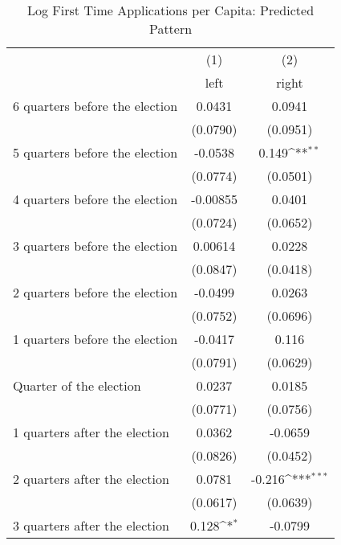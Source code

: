 \begin{table}[htbp]\centering
\def\sym#1{\ifmmode^{#1}\else\(^{#1}\)\fi}
\caption{Log First Time Applications per Capita: Predicted Pattern}
\begin{tabular}{l*{2}{c}}
\hline\hline
                    &\multicolumn{1}{c}{(1)}&\multicolumn{1}{c}{(2)}\\
                    &\multicolumn{1}{c}{left}&\multicolumn{1}{c}{right}\\
\hline
 6 quarters before the election&      0.0431         &      0.0941         \\
                    &    (0.0790)         &    (0.0951)         \\
[1em]
 5 quarters before the election&     -0.0538         &       0.149\sym{**} \\
                    &    (0.0774)         &    (0.0501)         \\
[1em]
 4 quarters before the election&    -0.00855         &      0.0401         \\
                    &    (0.0724)         &    (0.0652)         \\
[1em]
 3 quarters before the election&     0.00614         &      0.0228         \\
                    &    (0.0847)         &    (0.0418)         \\
[1em]
 2 quarters before the election&     -0.0499         &      0.0263         \\
                    &    (0.0752)         &    (0.0696)         \\
[1em]
 1 quarters before the election&     -0.0417         &       0.116         \\
                    &    (0.0791)         &    (0.0629)         \\
[1em]
Quarter of the election&      0.0237         &      0.0185         \\
                    &    (0.0771)         &    (0.0756)         \\
[1em]
 1 quarters after the election&      0.0362         &     -0.0659         \\
                    &    (0.0826)         &    (0.0452)         \\
[1em]
 2 quarters after the election&      0.0781         &      -0.216\sym{***}\\
                    &    (0.0617)         &    (0.0639)         \\
[1em]
 3 quarters after the election&       0.128\sym{*}  &     -0.0799         \\

\end{tabular}
\end{table}
